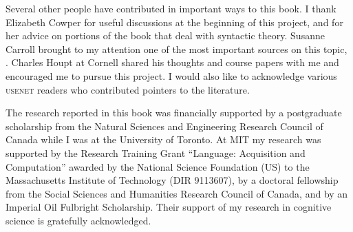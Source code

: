 Several other people have contributed in important ways to this book. I thank Elizabeth Cowper for useful discussions at the beginning of this project, and for her advice on portions of the book that deal with syntactic theory. Susanne Carroll brought to my attention one of the most important sources on this topic, \citealt{Birdsong1989}. Charles Houpt at Cornell shared his thoughts and course papers with me and encouraged me to pursue this project. I would also like to acknowledge various \textsc{usenet} readers who contributed pointers to the literature.


The research reported in this book was financially supported by a postgraduate scholarship from the Natural Sciences and Engineering Research Council of Canada while I was at the University of Toronto. At MIT my research was supported by the Research Training Grant ``Language: Acquisition and Computation'' awarded by the National Science Foundation (US) to the Massachusetts Institute of Technology (DIR 9113607), by a doctoral fellowship from the Social Sciences and Humanities Research Council of Canada, and by an Imperial Oil Fulbright Scholarship. Their support of my research in cognitive science is gratefully acknowledged.